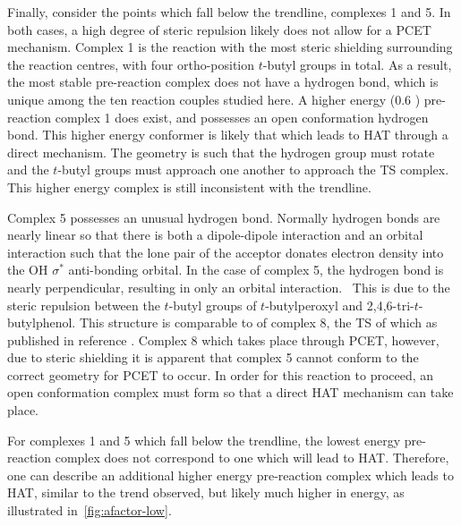 Finally, consider the points which fall below the trendline, complexes 1 and 5. In both cases, a high degree of steric repulsion likely does not allow for a PCET mechanism. Complex 1 is the reaction with the most steric shielding surrounding the reaction centres, with four ortho-position $t$-butyl groups in total. As a result, the most stable pre-reaction complex does not have a hydrogen bond, which is unique among the ten reaction couples studied here. A higher energy (0.6 \kcalmol) pre-reaction complex 1 does exist, and possesses an open conformation hydrogen bond. This higher energy conformer is likely that which leads to HAT through a direct mechanism. The geometry is such that the hydrogen group must rotate and the $t$-butyl groups must approach one another to approach the TS complex. This higher energy complex is still inconsistent with the trendline.

Complex 5 possesses an unusual hydrogen bond. Normally hydrogen bonds are nearly linear so that there is both a dipole-dipole interaction and an orbital interaction such that the lone pair of the acceptor donates electron density into the OH $\sigma^*$ anti-bonding orbital.\cite{Jeffrey1997} In the case of complex 5, the hydrogen bond is nearly perpendicular, resulting in only an orbital interaction.\footnotemark~ This is due to the steric repulsion between the $t$-butyl groups of $t$-butylperoxyl and 2,4,6-tri-$t$-butylphenol. This structure is comparable to of complex 8, the TS of which as published in reference . Complex 8 which takes place through PCET, however, due to steric shielding it is apparent that complex 5 cannot conform to the correct geometry for PCET to occur. In order for this reaction to proceed, an open conformation complex must form so that a direct HAT mechanism can take place.


For complexes 1 and 5 which fall below the trendline, the lowest energy pre-reaction complex does not correspond to one which will lead to HAT. Therefore, one can describe an additional higher energy pre-reaction complex which leads to HAT, similar to the trend observed, but likely much higher in energy, as illustrated in~\ref{fig:afactor-low}.

